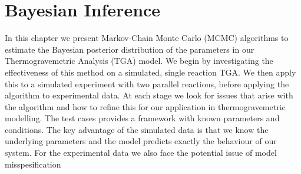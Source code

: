 \chapter{Bayesian Inference}
\label{Ch:Infer}
In this chapter we present Markov-Chain Monte Carlo (MCMC) algorithms to estimate the Bayesian posterior distribution of the parameters in our Thermogravemetric Analysis (TGA) model. We begin by investigating the effectiveness of this method on a simulated, single reaction TGA. We then apply this to a simulated experiment with two parallel reactions, before applying the algorithm to experimental data. At each stage we look for issues that arise with the algorithm and how to refine this for our application in thermogravemetric modelling. The test cases provides a framework with known parameters and conditions. The key advantage of the simulated data is that we know the underlying parameters and the model predicts exactly the behaviour of our system. For the experimental data we also face the potential issue of model misspesification \cite{KEN01,Bry14}\\

